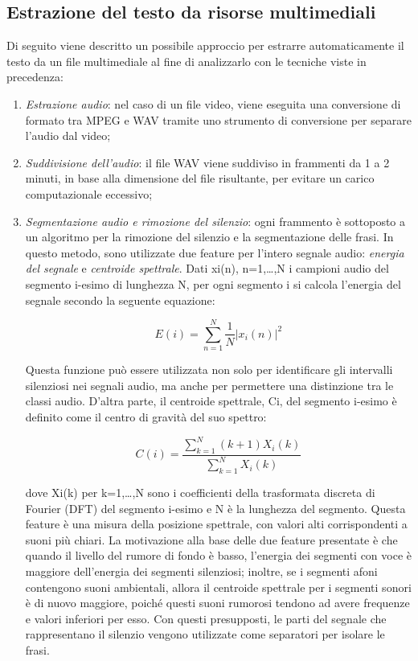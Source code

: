 \subsection{Estrazione del testo da risorse multimediali}
Di seguito viene descritto un possibile approccio per estrarre automaticamente il testo da un file multimediale al fine di analizzarlo con le tecniche viste in precedenza\cite{video}:
\begin{enumerate}
\item \textit{Estrazione audio}: nel caso di un file video, viene eseguita una conversione di formato tra MPEG e WAV tramite uno strumento di conversione per separare l'audio dal video;
\item \textit{Suddivisione dell'audio}: il file WAV viene suddiviso in frammenti da 1 a 2 minuti, in base alla dimensione del file risultante, per evitare un carico computazionale eccessivo;
\item \textit{Segmentazione audio e rimozione del silenzio}: ogni frammento è sottoposto a un algoritmo per la rimozione del silenzio e la segmentazione delle frasi. In questo metodo, sono utilizzate due feature per l'intero segnale audio: \textit{energia del segnale} e \textit{centroide spettrale}. Dati xi(n), n=1,…,N i campioni audio del segmento i-esimo di lunghezza N, per ogni segmento i si calcola l'energia del segnale secondo la seguente equazione:

\begin{equation}
E(i) = \sum^{N}_{n=1} \frac{1}{N}| x_i (n)|^{2}
\end{equation}

Questa funzione può essere utilizzata non solo per identificare gli intervalli silenziosi nei segnali audio, ma anche per permettere una distinzione tra le classi audio. D'altra parte, il centroide spettrale, Ci, del segmento i-esimo è definito come il centro di gravità del suo spettro:

\begin{equation}
C(i) = \frac{\sum^{N}_{k=1}(k+1)X_i (k)}{\sum^{N}_{k=1}X_i (k)}
\end{equation}

dove Xi(k) per k=1,…,N sono i coefficienti della trasformata discreta di Fourier (DFT) del segmento i-esimo e N è la lunghezza del segmento. Questa feature è una misura della posizione spettrale, con valori alti corrispondenti a suoni più chiari.
La motivazione alla base delle due feature presentate è che quando il livello del rumore di fondo è basso, l'energia dei segmenti con voce è maggiore dell'energia dei segmenti silenziosi; inoltre, se i segmenti afoni contengono suoni ambientali, allora il centroide spettrale per i segmenti sonori è di nuovo maggiore, poiché questi suoni rumorosi tendono ad avere frequenze e valori inferiori per esso. Con questi presupposti, le parti del segnale che rappresentano il silenzio vengono utilizzate come separatori per isolare le frasi.


\end{enumerate}
